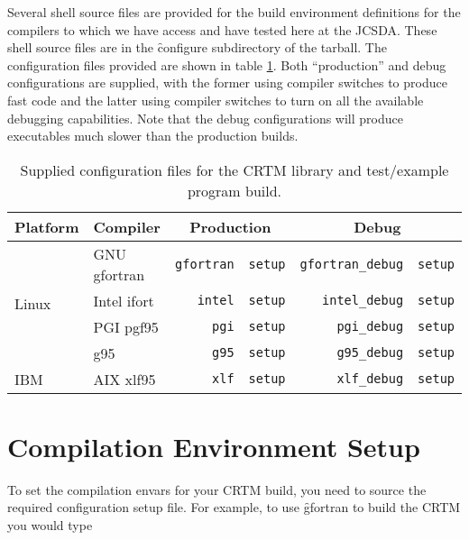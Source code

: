 Several shell source files are provided for the build environment definitions for the compilers to which we have access and have tested here at the JCSDA. These shell source files are in the \f{configure} subdirectory of the tarball. The configuration files provided are shown in table \ref{tab:supplied_configurations}. Both ``production'' and debug configurations are supplied, with the former using compiler switches to produce fast code and the latter using compiler switches to turn on all the available debugging capabilities. Note that the debug configurations will produce executables much slower than the production builds. 
\begin{table}[htp]
  \centering
  \caption{Supplied configuration files for the CRTM library and test/example program build.}
  \begin{tabular}{p{2cm} p{3cm} r@{.}l r@{.}l}
    \hline
    \sffamily\textbf{Platform} & \sffamily\textbf{Compiler} & \multicolumn{2}{c}{\sffamily\textbf{Production}} & \multicolumn{2}{c}{\sffamily\textbf{Debug}} \\
    \hline\hline
    \multirow{4}{*}{Linux} & GNU gfortran          & \texttt{gfortran}&\texttt{setup} & \texttt{gfortran\_debug}&\texttt{setup}\\
                           & Intel ifort           & \texttt{intel}&\texttt{setup}    & \texttt{intel\_debug}&\texttt{setup}   \\
                           & PGI pgf95             & \texttt{pgi}&\texttt{setup}      & \texttt{pgi\_debug}&\texttt{setup}     \\
                           & g95                   & \texttt{g95}&\texttt{setup}      & \texttt{g95\_debug}&\texttt{setup}     \\[0.3cm]
    IBM                    & AIX xlf95             & \texttt{xlf}&\texttt{setup}      & \texttt{xlf\_debug}&\texttt{setup}     \\
  \hline
  \end{tabular}
  \label{tab:supplied_configurations}
\end{table}


\section{Compilation Environment Setup}
To set the compilation envars for your CRTM build, you need to source the required configuration setup file. For example, to use \f{gfortran} to build the CRTM you would type

